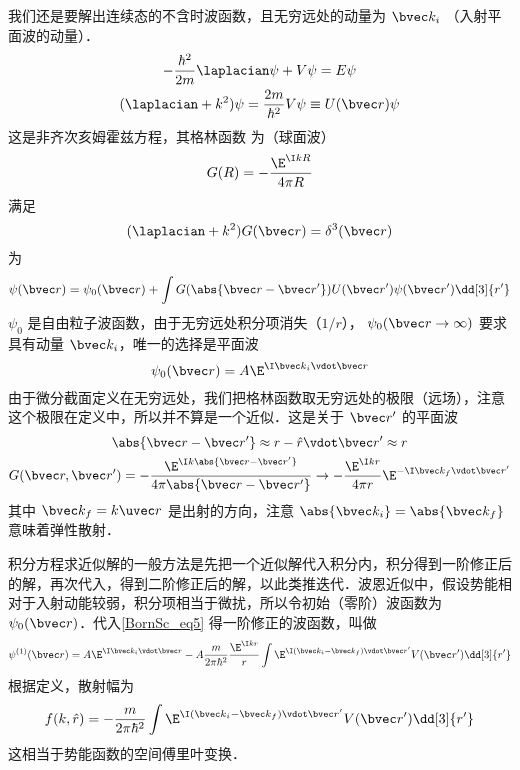 
我们还是要解出连续态的不含时波函数，且无穷远处的动量为 $\bvec k_i$ （入射平面波的动量）．
\begin{gather}
-\frac{\hbar^2}{2m} \laplacian\psi  + V\psi  = E\psi \\
(\laplacian + k^2)\psi  = \frac{2m}{\hbar^2} V\psi  \equiv U(\bvec r)\psi
\end{gather}
这是非齐次亥姆霍兹方程，其格林函数%
为（球面波）
\begin{equation}
G(R) =  -\frac{\E^{\I kR}}{4\pi R}
\end{equation}
满足
\begin{equation}
(\laplacian + k^2)G(\bvec r) = \delta^3(\bvec r)
\end{equation}
为
\begin{equation}\label{BornSc_eq5}
\psi(\bvec r) = \psi_0(\bvec r) + \int G(\abs{\bvec r - \bvec r'})U(\bvec r')\psi (\bvec r') \dd[3]{r'}
\end{equation}
$\psi_0$ 是自由粒子波函数，由于无穷远处积分项消失（$1/r$）， $\psi_0(\bvec r\to\infty)$ 要求具有动量 $\bvec k_i$，唯一的选择是平面波
\begin{equation}
\psi_0(\bvec r) = A\E^{\I\bvec k_i \vdot \bvec r}
\end{equation}
由于微分截面定义在无穷远处，我们把格林函数取无穷远处的极限（远场），注意这个极限在定义中，所以并不算是一个近似．这是关于 $\bvec r'$ 的平面波
\begin{gather}
\abs{\bvec r - \bvec r'} \approx r - \hat r \vdot \bvec r' \approx r\\
G(\bvec r, \bvec r') =  - \frac{\E^{\I k \abs{\bvec r - \bvec r'}}}{4\pi\abs{\bvec r - \bvec r'}} \to  - \frac{\E^{\I kr}}{4\pi r} \E^{-\I \bvec k_f \vdot \bvec r'}
\end{gather}
其中 $\bvec k_f = k\uvec r$ 是出射的方向，注意 $\abs{\bvec k_i} = \abs{\bvec k_f}$ 意味着弹性散射．

积分方程求近似解的一般方法是先把一个近似解代入积分内，积分得到一阶修正后的解，再次代入，得到二阶修正后的解，以此类推迭代．波恩近似中，假设势能相对于入射动能较弱，积分项相当于微扰，所以令初始（零阶）波函数为 $\psi_0(\bvec r)$．代入\autoref{BornSc_eq5} 得一阶修正的波函数，叫做
\begin{equation}
\psi ^{(1)}(\bvec r) = A\E^{\I\bvec k_i \vdot \bvec r} - A \frac{m}{2\pi\hbar^2} \frac{\E^{\I kr}}{r}\int \E^{\I (\bvec k_i - \bvec k_f) \vdot \bvec r'} V(\bvec r') \dd[3]{r'}
\end{equation}
根据定义，散射幅为
\begin{equation}
f(k, \hat r) =  - \frac{m}{2\pi\hbar^2} \int \E^{\I (\bvec k_i - \bvec k_f) \vdot \bvec r'} V(\bvec r') \dd[3]{r'}
\end{equation}
这相当于势能函数的空间傅里叶变换．

